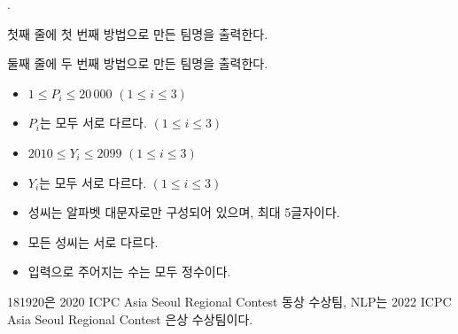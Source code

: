 \begin{problem}{\probno{}. \probtitle{}}
\OutputFile

첫째 줄에 첫 번째 방법으로 만든 팀명을 출력한다.

둘째 줄에 두 번째 방법으로 만든 팀명을 출력한다.

\newpage

\Constraints
\begin{itemize}[noitemsep]
    \item $1 \leq P_i \leq 20\,000$ $(1 \le i \le 3)$
    \item $P_i$는 모두 서로 다르다. $(1 \le i \le 3)$
    \item $2010 \leq Y_i \leq 2099$ $(1 \le i \le 3)$
    \item $Y_i$는 모두 서로 다르다. $(1 \le i \le 3)$
    \item 성씨는 알파벳 대문자로만 구성되어 있으며, 최대 5글자이다.
    \item 모든 성씨는 서로 다르다.
    \item 입력으로 주어지는 수는 모두 정수이다.
\end{itemize}

\Example

\begin{example}
\end{example}


\Notes

181920은 2020 ICPC Asia Seoul Regional Contest 동상 수상팀, NLP는 2022 ICPC Asia Seoul Regional Contest 은상 수상팀이다.


\end{problem}
